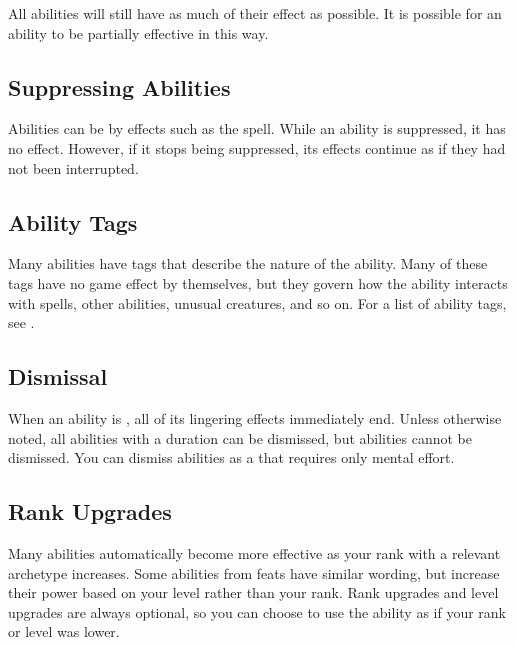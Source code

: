     All abilities will still have as much of their effect as possible.
    It is possible for an ability to be partially effective in this way.

  \subsection{Suppressing Abilities}\label{Suppressing Abilities}
    Abilities can be  by effects such as the  spell.
    While an ability is suppressed, it has no effect.
    However, if it stops being suppressed, its effects continue as if they had not been interrupted.

  \subsection{Ability Tags}
    Many abilities have tags that describe the nature of the ability.
    Many of these tags have no game effect by themselves, but they govern how the ability interacts with spells, other abilities, unusual creatures, and so on.
    For a list of ability tags, see .

  \subsection{Dismissal}\label{Dismissal}
    When an ability is , all of its lingering effects immediately end.
    Unless otherwise noted, all \magical abilities with a duration can be dismissed, but  abilities cannot be dismissed.
    You can dismiss abilities as a  that requires only mental effort.

  \subsection{Rank Upgrades}
    Many abilities automatically become more effective as your rank with a relevant archetype increases.
    Some abilities from feats have similar wording, but increase their power based on your level rather than your rank.
    Rank upgrades and level upgrades are always optional, so you can choose to use the ability as if your rank or level was lower.
